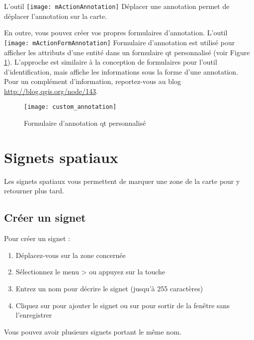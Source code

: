L'outil \texttt{[image: mActionAnnotation]} Déplacer une annotation permet de déplacer l'annotation sur la carte.  

 

En outre, vous pouvez créer vos propres formulaires d'annotation. L'outil \texttt{[image: mActionFormAnnotation]} Formulaire d'annotation est utilisé pour afficher les attributs d'une entité dans un formulaire qt personnalisé (voir Figure \ref{fig:custom-annotations}). L'approche est similaire à la conception de formulaires pour l'outil d'identification, mais affiche les informations sous la forme d'une annotation. Pour un complément d'information, reportez-vous au blog \url{http://blog.qgis.org/node/143}.

\begin{figure}[ht]
   \centering
   \texttt{[image: custom\_annotation]}
   \caption{Formulaire d'annotation qt personnalisé \nixcaption}
   \label{fig:custom-annotations}
\end{figure}

\newpage


\section{Signets spatiaux} \label{sec:bookmarks}

Les signets spatiaux vous permettent de marquer une zone de la carte pour y retourner plus tard.

\subsection{Créer un signet}
Pour créer un signet :
\begin{enumerate}
\item Déplacez-vous sur la zone concernée
\item Sélectionnez le menu  >  ou appuyez sur la touche 
\item Entrez un nom pour décrire le signet (jusqu'à 255 caractères)
\item Cliquez sur  pour ajouter le signet ou sur  pour sortir de la fenêtre sans l'enregistrer
\end{enumerate}

Vous pouvez avoir plusieurs signets portant le même nom.

